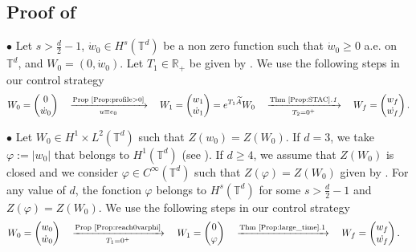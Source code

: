 \documentclass[a4paper]{article}
\theoremstyle{plain}
\newcommand{\T}{\mathbb{T}}
\newcommand{\R}{\mathbb{R}}
\begin{document}
\subsection{Proof of }
\label{subsec:LT3}

\noindent $\bullet$ Let $s>\frac{d}{2}-1$,
$\dot{w}_0 \in H^{s}(\T^d)$ be a non zero function such that 
$\dot{w}_0 \geq 0$ a.e. on $\T^d$, 
and $W_0=(0,\dot{w}_0)$. 
Let $T_1 \in \R_+$ be given by . We use the following steps in our control strategy
$$W_0=\begin{pmatrix}
    0 \\ \dot{w}_0
\end{pmatrix}
\quad \xrightarrow[u \equiv e_0]{\text{Prop \ref{Prop:profile>0}}} \quad
W_1=\begin{pmatrix}
    w_1 \\ \dot{w}_1
\end{pmatrix}=e^{T_1 \widetilde{A} }W_0
\quad \xrightarrow[T_2=0^+]{\text{Thm \ref{Prop:STAC}\emph{.1}}} \quad
W_f=\begin{pmatrix}
    w_f \\ \dot{w_f}
\end{pmatrix}.$$

\bigskip

\noindent $\bullet$ Let $W_0 \in H^1 \times L^2(\T^d)$ such that $Z(w_0)=Z(W_0)$. If $d=3$, we take $\varphi:=|w_0|$ that belongs to $H^1(\T^d)$ (see \cite[Theorem 4.4]{EvansGariepy}). If $d \geq 4$, we assume that $Z(W_0)$ is closed and we consider $\varphi \in C^{\infty}(\T^d)$ such that $Z(\varphi)=Z(W_0)$ given by . For any value of $d$, the fonction $\varphi$ belongs to $H^{s}(\T^d)$ for some $s>\frac{d}{2}-1$ and $Z(\varphi)=Z(W_0)$. We use the following steps in our control strategy
$$\begin{aligned}
& W_0=\begin{pmatrix}
    w_0 \\ \dot{w}_0
\end{pmatrix}
\quad \xrightarrow[T_1=0^+]{\text{Prop \ref{Prop:reach0varphi}}} \quad
W_1=\begin{pmatrix}
    0 \\ \varphi
\end{pmatrix}
\quad \xrightarrow[]{\text{Thm \ref{Prop:large_time}.1}} \quad
W_f=\begin{pmatrix}
    w_f \\ \dot{w_f}
\end{pmatrix}.
\end{aligned}$$
\end{document}
